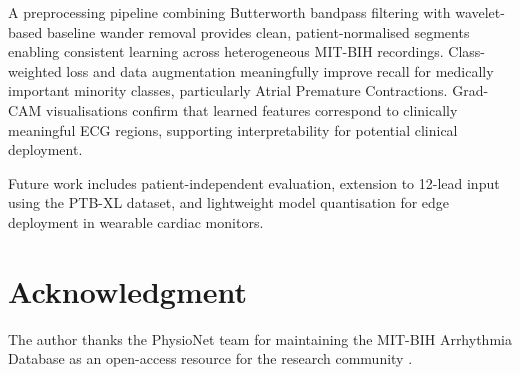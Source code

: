 \documentclass[conference]{IEEEtran}
\begin{document}
A preprocessing pipeline combining Butterworth bandpass filtering with wavelet-based baseline wander removal provides clean, patient-normalised segments enabling consistent learning across heterogeneous MIT-BIH recordings. Class-weighted loss and data augmentation meaningfully improve recall for medically important minority classes, particularly Atrial Premature Contractions. Grad-CAM visualisations confirm that learned features correspond to clinically meaningful ECG regions, supporting interpretability for potential clinical deployment.

Future work includes patient-independent evaluation, extension to 12-lead input using the PTB-XL dataset, and lightweight model quantisation for edge deployment in wearable cardiac monitors.

\section*{Acknowledgment}

The author thanks the PhysioNet team for maintaining the MIT-BIH Arrhythmia Database as an open-access resource for the research community \cite{b15}.
\end{document}
